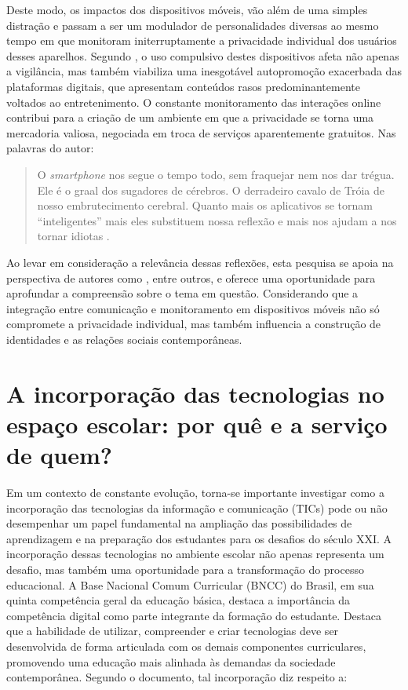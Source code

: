 \documentclass[portuguese]{textolivre}
\begin{document}
Deste modo, os impactos dos dispositivos móveis, vão além de uma simples distração e passam a ser um modulador de personalidades diversas ao mesmo tempo em que monitoram initerruptamente a privacidade individual dos usuários desses aparelhos.  Segundo \textcite{desmurget_fabrica_2021}, o uso compulsivo destes dispositivos afeta não apenas a vigilância, mas também viabiliza uma inesgotável autopromoção exacerbada das plataformas digitais, que apresentam conteúdos rasos predominantemente voltados ao entretenimento. O constante monitoramento das interações online contribui para a criação de um ambiente em que a privacidade se torna uma mercadoria valiosa, negociada em troca de serviços aparentemente gratuitos. Nas palavras do autor:

\begin{quote}
    O \textit{smartphone} nos segue o tempo todo, sem fraquejar nem nos dar trégua. Ele é o graal dos sugadores de cérebros. O derradeiro cavalo de Tróia de nosso embrutecimento cerebral. Quanto mais os aplicativos se tornam “inteligentes” mais eles substituem nossa reflexão e mais nos ajudam a nos tornar idiotas \cite[p. 68]{desmurget_fabrica_2021}.
\end{quote}

Ao levar em consideração a relevância dessas reflexões, esta pesquisa se apoia na perspectiva de autores como \textcite{assange_2013-1,desmurget_fabrica_2021,quiroga_o_2013}, entre outros, e oferece uma oportunidade para aprofundar a compreensão sobre o tema em questão. Considerando que a integração entre comunicação e monitoramento em dispositivos móveis não só compromete a privacidade individual, mas também influencia a construção de identidades e as relações sociais contemporâneas.


\section{A incorporação das tecnologias no espaço escolar: por quê e a serviço de quem?}\label{sec-fmt-manuscrito}
Em um contexto de constante evolução, torna-se importante investigar como a incorporação das tecnologias da informação e comunicação (TICs) pode ou não desempenhar um papel fundamental na ampliação das possibilidades de aprendizagem e na preparação dos estudantes para os desafios do século XXI. A incorporação dessas tecnologias no ambiente escolar não apenas representa um desafio, mas também uma oportunidade para a transformação do processo educacional.
A Base Nacional Comum Curricular (BNCC) do Brasil, em sua quinta competência geral da educação básica, destaca a importância da competência digital como parte integrante da formação do estudante. Destaca que a habilidade de utilizar, compreender e criar tecnologias deve ser desenvolvida de forma articulada com os demais componentes curriculares, promovendo uma educação mais alinhada às demandas da sociedade contemporânea. Segundo o documento, tal incorporação diz respeito a:
\end{document}
